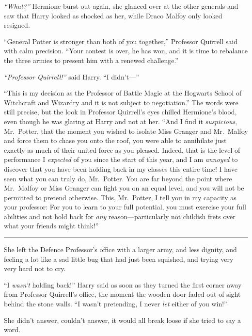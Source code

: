 \emph{``What?''} Hermione burst out again, she glanced over at the other
generals and saw that Harry looked as shocked as her, while Draco Malfoy
only looked resigned.

``General Potter is stronger than both of you together,'' Professor
Quirrell said with calm precision. ``Your contest is over, he has won,
and it is time to rebalance the three armies to present him with a
renewed challenge.''

\emph{``Professor Quirrell!''} said Harry. ``I didn't---''

``This is my decision as the Professor of Battle Magic at the Hogwarts
School of Witchcraft and Wizardry and it is not subject to
negotiation.'' The words were still precise, but the look in Professor
Quirrell's eyes chilled Hermione's blood, even though he was glaring at
Harry and not at her. ``And I find it \emph{suspicious}, Mr.~Potter,
that the moment you wished to isolate Miss Granger and Mr.~Malfoy and
force them to chase you onto the roof, you were able to annihilate just
exactly as much of their united force as you pleased. Indeed, that is
the level of performance I \emph{expected} of you since the start of
this year, and I am \emph{annoyed} to discover that you have been
holding back in my classes this entire time! I have seen what you can
truly do, Mr.~Potter. You are far beyond the point where Mr.~Malfoy or
Miss Granger can fight you on an equal level, and you will not be
permitted to pretend otherwise. This, Mr.~Potter, I tell you in my
capacity as your professor: For you to learn to your full potential, you
must exercise your full abilities and not hold back for \emph{any}
reason---particularly not childish frets over what your friends might
think!''

\begin{center}\rule{3in}{0.4pt}\end{center}

She left the Defence Professor's office with a larger army, and less
dignity, and feeling a lot like a sad little bug that had just been
squished, and trying very very hard not to cry.

``I \emph{wasn't} holding back!'' Harry said as soon as they turned the
first corner away from Professor Quirrell's office, the moment the
wooden door faded out of sight behind the stone walls. ``I wasn't
pretending, I never \emph{let} either of you win!''

She didn't answer, couldn't answer, it would all break loose if she
tried to say a word.

